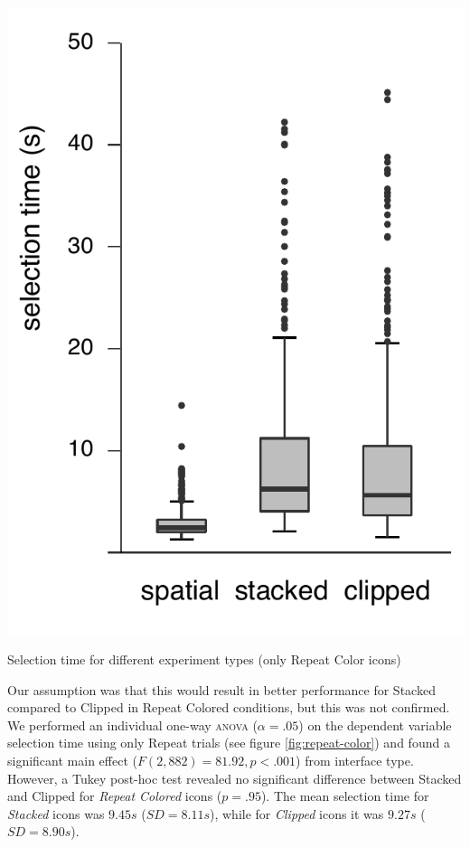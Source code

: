 \documentclass[nobib]{tufte-book} %
\begin{document}
\begin{marginfigure}
  \includegraphics[width=\linewidth]{repeat-color.pdf}
  \caption{Selection time for different experiment types (only Repeat Color icons)}
  \label{fig:repeat-color}
\end{marginfigure}

Our assumption was that this would result in better performance for Stacked compared to Clipped in Repeat Colored conditions, but this was not confirmed. We performed an individual one-way \textsc{anova} ($\alpha = .05$) on the dependent variable selection time using only Repeat trials (see figure \ref{fig:repeat-color}) and found a significant main effect ($F(2,882) = 81.92, p < .001$) from interface type.
However, a Tukey post-hoc test revealed no significant difference between Stacked and Clipped for \emph{Repeat Colored} icons ($p = .95$). The mean selection time for \emph{Stacked} icons was $9.45 s$ ($SD = 8.11 s$), while for \emph{Clipped} icons it was $9.27 s$ ($SD = 8.90 s$).
\end{document}
